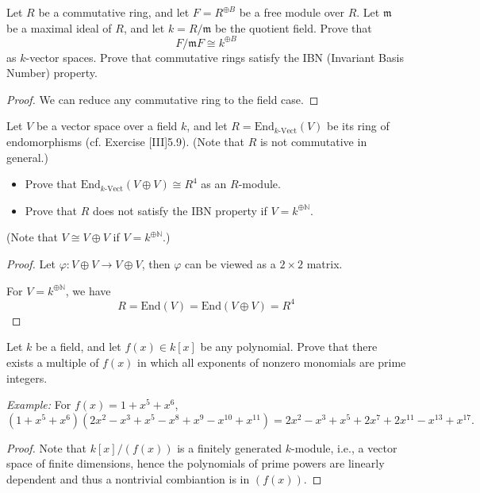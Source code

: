 \documentclass[openany]{book}
\begin{document}
\begin{prob}[1.11]
    Let \( R \) be a commutative ring, and let \( F = R^{\oplus B} \) be a free module over \( R \). Let \( \mathfrak{m} \) be a maximal ideal of \( R \), and let \( k = R/\mathfrak{m} \) be the quotient field. Prove that
\[
F/\mathfrak{m}F \cong k^{\oplus B}
\]
as \( k \)-vector spaces. Prove that commutative rings satisfy the IBN (Invariant Basis Number) property.
\end{prob}
\begin{proof}
    We can reduce any commutative ring to the field case.
\end{proof}


\begin{prob}[1.12]
    Let \( V \) be a vector space over a field \( k \), and let \( R = \text{End}_{k\text{-Vect}}(V) \) be its ring of endomorphisms (cf. Exercise [III]5.9). (Note that \( R \) is not commutative in general.)
\begin{itemize}
    \item Prove that \(\text{End}_{k\text{-Vect}}(V \oplus V) \cong R^4\) as an \( R \)-module.
    \item Prove that \( R \) does not satisfy the IBN property if \( V = k^{\oplus \mathbb{N}} \).
\end{itemize}
(Note that \( V \cong V \oplus V \) if \( V = k^{\oplus \mathbb{N}} \).)
\end{prob}
\begin{proof}
    Let $\varphi:V\oplus V\to V\oplus V$, then $\varphi$ can be viewed as a $2\times 2$ matrix. 

    For $V=k^{\oplus\mathbb{N}}$, we have 
    \begin{equation*}
        R=\text{End}(V)=\text{End}(V\oplus V)=R^4
    \end{equation*}


\end{proof}

\begin{prob}[1.19]
    Let \( k \) be a field, and let \( f(x) \in k[x] \) be any polynomial. Prove that there exists a multiple of \( f(x) \) in which all exponents of nonzero monomials are prime integers. 

\textit{Example:} For \( f(x) = 1 + x^5 + x^6 \),
\[
(1 + x^5 + x^6)(2x^2 - x^3 + x^5 - x^8 + x^9 - x^{10} + x^{11}) = 2x^2 - x^3 + x^5 + 2x^7 + 2x^{11} - x^{13} + x^{17}.
\]
\end{prob}
\begin{proof}
    Note that $k[x]/(f(x))$ is a finitely generated $k$-module, i.e., a vector space of finite dimensions, hence the polynomials of prime powers are linearly dependent and thus a nontrivial combiantion is in $(f(x))$.
\end{proof}
\end{document}

